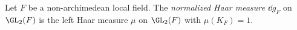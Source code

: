 Let $F$ be a non-archimedean local field. The \emph{normalized Haar measure} $\dd g_F$ on $\GL_2(F)$ is the left Haar
measure $\mu$ on $\GL_2(F)$ with $\mu(K_F)=1$.
